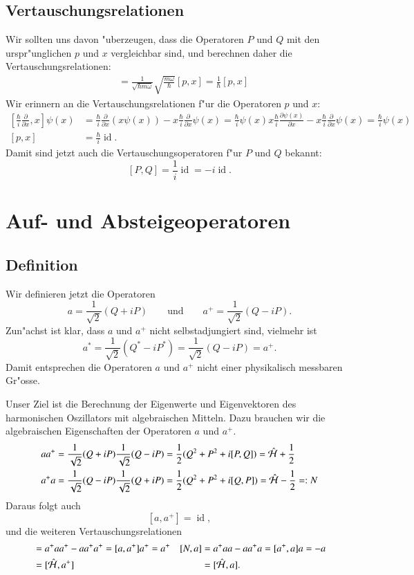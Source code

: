\subsection{Vertauschungsrelationen}
Wir sollten uns davon "uberzeugen, dass die Operatoren $P$ und $Q$ 
mit den urspr"unglichen $p$ und $x$ vergleichbar sind, und berechnen
daher die Vertauschungsrelationen:
\begin{align*}
[P,Q]
&=
\frac{1}{\sqrt{\hbar m\omega}} \sqrt{\frac{m\omega}{\hbar}}[p, x]
=
\frac1{\hbar}[p,x]
\end{align*}
Wir erinnern an die Vertauschungsrelationen f"ur die Operatoren $p$ und $x$:
\begin{align*}
\left[\frac{\hbar}{i}\frac{\partial}{\partial x}, x\right]\psi(x)
&=
\frac{\hbar}{i}\frac{\partial}{\partial x}(x\psi(x))
-x\frac{\hbar}{i}\frac{\partial}{\partial x}\psi(x)
=
\frac{\hbar}{i}\psi(x)
x\frac{\hbar}{i}\frac{\partial \psi(x)}{\partial x}
-x\frac{\hbar}{i}\frac{\partial}{\partial x}\psi(x)
=\frac{\hbar}{i}\psi(x)
\\
[p,x]&=\frac{\hbar}{i}\operatorname{id}.
\end{align*}
Damit sind jetzt auch die Vertauschungsoperatoren f"ur $P$ und $Q$ 
bekannt:
\[
[P,Q]=\frac1{i}\operatorname{id}=-i\operatorname{id}.
\]

\section{Auf- und Absteigeoperatoren}
\subsection{Definition}
Wir definieren jetzt die Operatoren
\[
a=\frac1{\sqrt{2}}(Q+iP)
\qquad\text{und}\qquad
a^+=\frac1{\sqrt{2}}(Q-iP).
\]
Zun"achst ist klar, dass $a$ und $a^+$ nicht selbstadjungiert sind,
vielmehr ist
\[
a^*=\frac1{\sqrt{2}}(Q^*-iP^*)=\frac1{\sqrt{2}}(Q-iP)=a^+.
\]
Damit entsprechen die Operatoren $a$ und $a^+$ nicht einer physikalisch
messbaren Gr"osse. 

Unser Ziel ist die Berechnung der Eigenwerte und Eigenvektoren
des harmonischen Oszillators mit algebraischen Mitteln. Dazu brauchen
wir die algebraischen Eigenschaften der Operatoren $a$ und $a^+$.
\begin{align*}
aa^+
&=
\frac1{\sqrt{2}}(Q+iP)\frac1{\sqrt{2}}(Q-iP)
=
\frac12(Q^2+P^2+i[P,Q])
=
\hat{\cal H}+\frac12
\\
a^+a
&=
\frac1{\sqrt{2}}(Q-iP)\frac1{\sqrt{2}}(Q+iP)
=
\frac12(Q^2+P^2+i[Q,P])
=
\hat{\cal H}-\frac12=:N
\end{align*}
Daraus folgt auch
\[
[a,a^+]=\operatorname{id},
\]
und die weiteren Vertauschungsrelationen
\begin{align*}
[N,a^+]
&=a^+aa^+-aa^+a^+=[a,a^+]a^+=a^+
&
[N,a]
&=a^+aa-aa^+a=[a^+,a]a=-a
\\
&=[\hat{\cal H},a^+]
&
&=[\hat{\cal H}, a].
\end{align*}

